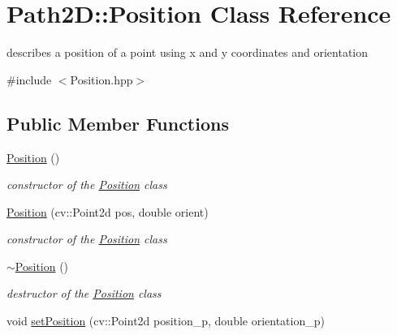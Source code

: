 \hypertarget{class_path2_d_1_1_position}{}\section{Path2D\+:\+:Position Class Reference}
\label{class_path2_d_1_1_position}


describes a position of a point using x and y coordinates and orientation  




{\ttfamily \#include $<$Position.\+hpp$>$}

\subsection*{Public Member Functions}
\begin{DoxyCompactItemize}
\item 
\mbox{\label{class_path2_d_1_1_position_a2aeded1dd8d045ec08bc223497569a31}} 
\mbox{\hyperlink{class_path2_d_1_1_position_a2aeded1dd8d045ec08bc223497569a31}{Position}} ()
\begin{DoxyCompactList}\small\item\em constructor of the \mbox{\hyperlink{class_path2_d_1_1_position}{Position}} class \end{DoxyCompactList}\item 
\mbox{\hyperlink{class_path2_d_1_1_position_a1e399aed3b9ee6c939041fcf210d1aa6}{Position}} (cv\+::\+Point2d pos, double orient)
\begin{DoxyCompactList}\small\item\em constructor of the \mbox{\hyperlink{class_path2_d_1_1_position}{Position}} class \end{DoxyCompactList}\item 
\mbox{\label{class_path2_d_1_1_position_aa38e1e2906ab4726840795ce9596b810}} 
\mbox{\hyperlink{class_path2_d_1_1_position_aa38e1e2906ab4726840795ce9596b810}{$\sim$\+Position}} ()
\begin{DoxyCompactList}\small\item\em destructor of the \mbox{\hyperlink{class_path2_d_1_1_position}{Position}} class \end{DoxyCompactList}\item 
void \mbox{\hyperlink{class_path2_d_1_1_position_aaf9197b7320cde418bfcd0c0e149cd26}{set\+Position}} (cv\+::\+Point2d position\+\_\+p, double orientation\+\_\+p)

\end{DoxyCompactItemize}
